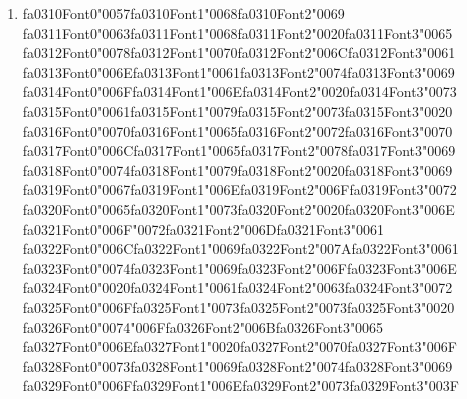 \documentclass[12pt]{article}
\begin{document}
\begin{enumerate}[label=Q\arabic*.]
 \item {\csname fa0310Font0\endcsname\char"0057}{\csname fa0310Font1\endcsname\char"0068}{\csname fa0310Font2\endcsname\char"0069} {\csname fa0311Font0\endcsname\char"0063}{\csname fa0311Font1\endcsname\char"0068}{\csname fa0311Font2\endcsname\char"0020}{\csname fa0311Font3\endcsname\char"0065} {\csname fa0312Font0\endcsname\char"0078}{\csname fa0312Font1\endcsname\char"0070}{\csname fa0312Font2\endcsname\char"006C}{\csname fa0312Font3\endcsname\char"0061} {\csname fa0313Font0\endcsname\char"006E}{\csname fa0313Font1\endcsname\char"0061}{\csname fa0313Font2\endcsname\char"0074}{\csname fa0313Font3\endcsname\char"0069} {\csname fa0314Font0\endcsname\char"006F}{\csname fa0314Font1\endcsname\char"006E}{\csname fa0314Font2\endcsname\char"0020}{\csname fa0314Font3\endcsname\char"0073} {\csname fa0315Font0\endcsname\char"0061}{\csname fa0315Font1\endcsname\char"0079}{\csname fa0315Font2\endcsname\char"0073}{\csname fa0315Font3\endcsname\char"0020} {\csname fa0316Font0\endcsname\char"0070}{\csname fa0316Font1\endcsname\char"0065}{\csname fa0316Font2\endcsname\char"0072}{\csname fa0316Font3\endcsname\char"0070} {\csname fa0317Font0\endcsname\char"006C}{\csname fa0317Font1\endcsname\char"0065}{\csname fa0317Font2\endcsname\char"0078}{\csname fa0317Font3\endcsname\char"0069} {\csname fa0318Font0\endcsname\char"0074}{\csname fa0318Font1\endcsname\char"0079}{\csname fa0318Font2\endcsname\char"0020}{\csname fa0318Font3\endcsname\char"0069} {\csname fa0319Font0\endcsname\char"0067}{\csname fa0319Font1\endcsname\char"006E}{\csname fa0319Font2\endcsname\char"006F}{\csname fa0319Font3\endcsname\char"0072} {\csname fa0320Font0\endcsname\char"0065}{\csname fa0320Font1\endcsname\char"0073}{\csname fa0320Font2\endcsname\char"0020}{\csname fa0320Font3\endcsname\char"006E} {\csname fa0321Font0\endcsname\char"006F}{\char"0072}{\csname fa0321Font2\endcsname\char"006D}{\csname fa0321Font3\endcsname\char"0061} {\csname fa0322Font0\endcsname\char"006C}{\csname fa0322Font1\endcsname\char"0069}{\csname fa0322Font2\endcsname\char"007A}{\csname fa0322Font3\endcsname\char"0061} {\csname fa0323Font0\endcsname\char"0074}{\csname fa0323Font1\endcsname\char"0069}{\csname fa0323Font2\endcsname\char"006F}{\csname fa0323Font3\endcsname\char"006E} {\csname fa0324Font0\endcsname\char"0020}{\csname fa0324Font1\endcsname\char"0061}{\csname fa0324Font2\endcsname\char"0063}{\csname fa0324Font3\endcsname\char"0072} {\csname fa0325Font0\endcsname\char"006F}{\csname fa0325Font1\endcsname\char"0073}{\csname fa0325Font2\endcsname\char"0073}{\csname fa0325Font3\endcsname\char"0020} {\csname fa0326Font0\endcsname\char"0074}{\char"006F}{\csname fa0326Font2\endcsname\char"006B}{\csname fa0326Font3\endcsname\char"0065} {\csname fa0327Font0\endcsname\char"006E}{\csname fa0327Font1\endcsname\char"0020}{\csname fa0327Font2\endcsname\char"0070}{\csname fa0327Font3\endcsname\char"006F} {\csname fa0328Font0\endcsname\char"0073}{\csname fa0328Font1\endcsname\char"0069}{\csname fa0328Font2\endcsname\char"0074}{\csname fa0328Font3\endcsname\char"0069} {\csname fa0329Font0\endcsname\char"006F}{\csname fa0329Font1\endcsname\char"006E}{\csname fa0329Font2\endcsname\char"0073}{\csname fa0329Font3\endcsname\char"003F}

\end{enumerate}
\end{document}
